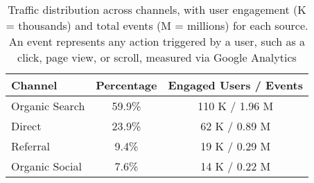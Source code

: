 \begin{table}[h]
\centering
\small
\begin{tabular}{lcc}
\toprule
\textbf{Channel}       & \textbf{Percentage} & \textbf{Engaged Users / Events}\\ 
\midrule
Organic Search         & 59.9\%  &  110 K / 1.96 M                          \\ 
Direct                 & 23.9\%  &  62 K / 0.89 M                           \\ 
Referral               & 9.4\%   &  19 K / 0.29 M                           \\ 
Organic Social         & 7.6\%   &  14 K / 0.22 M                           \\ 
\midrule
\end{tabular}
\caption{Traffic distribution across channels, with user engagement (K = thousands) and total events (M = millions) for each source. An event represents any action triggered by a user, such as a click, page view, or scroll, measured via Google Analytics}
\label{tab:traffic_distribution}
\vspace{-10pt}
\end{table}